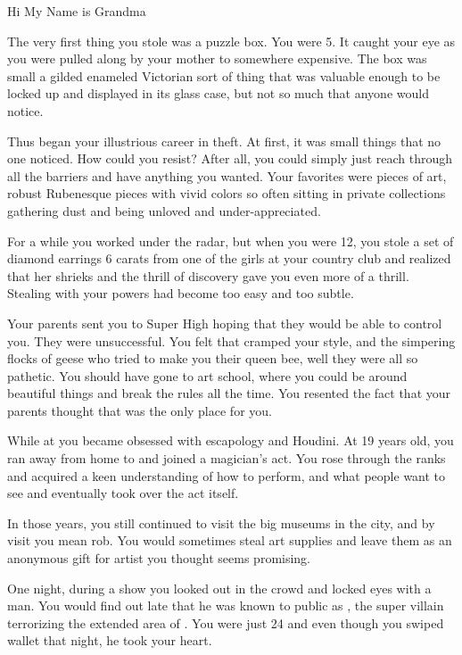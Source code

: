 \documentclass[char]{LRSguildcamp1}
\begin{document}
\name{\cGrandma{}}
Hi My Name is Grandma

The very first thing you stole was a puzzle box. You were 5. It caught your eye as you were pulled along by your mother to somewhere expensive. The box was small a gilded enameled Victorian sort of thing that was valuable enough to be locked up and displayed in its glass case, but not so much that anyone would notice. 

Thus began your illustrious career in theft. At first, it was small things that no one noticed. How could you resist? After all, you could simply just reach through all the barriers and have anything you wanted. Your favorites were pieces of art, robust Rubenesque pieces with vivid colors so often sitting in private collections gathering dust and being unloved and under-appreciated. 

For a while you worked under the radar,  but when you were 12, you stole a set of diamond earrings 6 carats from one of the girls at your country club and realized that her shrieks and the thrill of discovery gave you even more of a thrill. Stealing with your powers had become too easy and too subtle. 

Your parents sent you to Super High hoping that they would be able to control you. They were unsuccessful. You felt that \pSuperSchool{} cramped your style, and the simpering flocks of geese who tried to make you their queen bee, well they were all so pathetic. You should have gone to art school, where you could be around beautiful things and break the rules all the time. You resented the fact that your parents thought that \pSuperSchool{} was the only place for you. 

While at \pSuperSchool{} you became obsessed with escapology and Houdini. At 19 years old, you ran away from home to \pCityGrandma{} and joined a magician’s act. You rose through the ranks and acquired a keen understanding of how to perform, and what people want to see and eventually took over the act itself.  

In those years, you still continued to visit the big museums in the city, and by visit you mean rob. You would sometimes steal art supplies and leave them as an anonymous gift for artist you thought seems promising. 

One night, during a show you looked out in the crowd and locked eyes with a man. You would find out late that he was known to public as \cGS{}, the super villain terrorizing the extended area of \pCityO{}. You were just 24 and even though you swiped \cGS{\their} wallet that night, he took your heart. 
\end{document}
